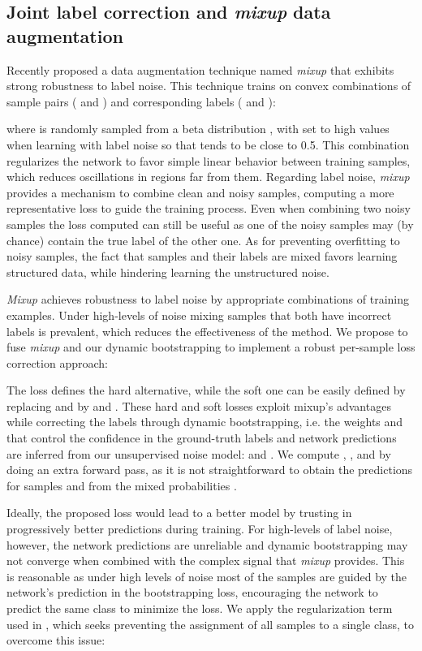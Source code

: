 \documentclass{article}
\begin{document}
\subsection{Joint label correction and \emph{mixup} data augmentation\label{subsec:JointMixBoot}}

Recently \cite{2018_ICLR_mixup} proposed a data augmentation technique
named \emph{mixup} that exhibits strong robustness to label
noise. This technique trains on convex combinations of sample pairs ( and ) and corresponding labels (
and ): 


where  is randomly sampled from a beta distribution ,
with  set to high values when learning with label
noise so that  tends to be close to 0.5. This combination regularizes the network to favor simple linear
behavior between training samples, which reduces oscillations
in regions far from them. Regarding label
noise, \emph{mixup} provides a mechanism to combine clean and noisy samples, computing a more representative loss to guide
the training process. Even when combining two noisy
samples the loss computed can still be useful as one of the noisy
samples may (by chance) contain the true label of the other one. As for preventing
overfitting to noisy samples, the fact that samples and their labels
are mixed favors learning structured data, while hindering learning
the unstructured noise.

\emph{Mixup} achieves robustness to label noise by 
appropriate combinations of training examples. Under high-levels of noise
 mixing samples that both have incorrect labels is prevalent, which reduces the effectiveness of the method. 
 We propose to fuse \emph{mixup} and our dynamic bootstrapping to implement a robust per-sample loss correction approach: 


The loss  defines the hard alternative, while the soft
one can be easily defined by replacing  and  by 
and . These hard and soft losses exploit mixup's advantages
while correcting the labels through dynamic bootstrapping, i.e. the
weights  and  that control the confidence in the ground-truth
labels and network predictions are inferred from our unsupervised noise model:
 and .
We compute , ,  and  by doing an extra forward pass, as it is not straightforward to obtain the predictions for samples 
and  from the mixed probabilities .

Ideally, the proposed loss  would lead to a better model
by trusting in progressively better predictions during training. For high-levels of label noise, however, the network predictions are unreliable
and dynamic bootstrapping may not converge when combined with the
complex signal that \emph{mixup} provides. This is reasonable as under high
levels of noise most of the samples are guided by the network's prediction
in the bootstrapping loss, encouraging the network to predict the same
class to minimize the loss. We
apply the regularization term used in \cite{2018_CVPR_JointOpt},
which seeks preventing the assignment of all samples to a single class, to overcome this issue:
\end{document}
